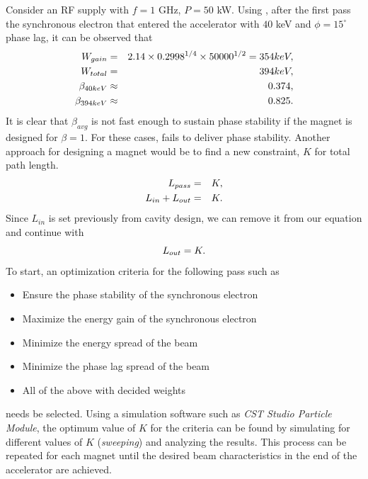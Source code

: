\documentclass[a4paper,oneside,12pt]{report}
\numberwithin{equation}{chapter}
\begin{document}
Consider an RF supply with $f=1$ GHz, $P=50$ kW. Using , 
after the first pass the synchronous electron that entered the accelerator with $40$ keV and $\phi=15^\circ$ phase lag,
it can be observed that
\vspace{-10pt}\begin{eqnarray}
    W_{gain} &=& 2.14\times0.2998^{1/4}\times 50000^{1/2} = 354keV   ,\\
    W_{total} &=& 394 keV   ,\\
    \beta_{40keV} &\approx& 0.374   ,\\
    \beta_{394keV} &\approx& 0.825 .
\vspace{-20pt}\end{eqnarray}
It is clear that $\beta_{avg}$ is not fast enough to sustain phase stability if the magnet is designed for $\beta = 1$. 
For these cases,  fails to deliver phase stability.
Another approach for designing a magnet would be to find a new constraint, $K$ for total path length.
\vspace{-10pt}\begin{eqnarray}
    L_{pass} &=& K ,\\
    L_{in} + L_{out} &=& K .
\vspace{-20pt}\end{eqnarray}
Since $L_{in}$ is set previously from cavity design, we can remove it from our equation and continue with
\vspace{-10pt}\begin{equation} \label{eq:mag_sweep_constraint}
    L_{out} = K .
\vspace{-10pt}\end{equation}
\clearpage
To start, an optimization criteria for the following pass such as
\vspace{-10pt}
\begin{itemize}
    \item Ensure the phase stability of the synchronous electron
    \item Maximize the energy gain of the synchronous electron
    \item Minimize the energy spread of the beam
    \item Minimize the phase lag spread of the beam
    \item All of the above with decided weights
\vspace{-10pt}\end{itemize}
needs be selected. Using a simulation software such as \textit{CST Studio Particle Module}, the optimum value of $K$ for the criteria can be found by simulating for different values of $K$ (\textit{sweeping}) and analyzing the results.
This process can be repeated for each magnet until the desired beam characteristics in the end of the accelerator are achieved.
\end{document}
